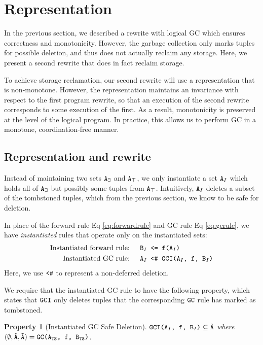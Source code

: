 \documentclass[10pt]{proc}
\numberwithin{equation}{section}
\newtheorem{property}{Property}[section]
\renewcommand{\tt}[1]{\ifmmode\text{\texttt{#1}}\else\texttt{#1}\fi}
\begin{document}
\section{Representation}
In the previous section, we described a rewrite with logical GC which ensures correctness and monotonicity.
However, the garbage collection only marks tuples for possible deletion, and thus does not actually reclaim any storage.
Here, we present a second rewrite that does in fact reclaim storage.

To achieve storage reclamation, our second rewrite will use a representation that is non-monotone.
However, the representation maintains an invariance with respect to the first program rewrite, so that an execution of the second rewrite corresponds to some execution of the first.
As a result, monotonicity is preserved at the level of the logical program.
In practice, this allows us to perform GC in a monotone, coordination-free manner.

\subsection{Representation and rewrite}
Instead of maintaining two sets $\tt{A}_\exists$ and $\tt{A}_\top$, we only instantiate a set $\tt{A}_I$ which holds all of $\tt{A}_\exists$ but possibly some tuples from $\tt{A}_\top$.
Intuitively, $\tt{A}_I$ deletes a subset of the tombstoned tuples, which from the previous section, we know to be safe for deletion.

In place of the forward rule Eq \eqref{eq:forwardrule} and GC rule Eq \eqref{eq:gcrule}, we have \textit{instantiated} rules that operate only on the instantiated sets: 
\begin{align}
\text{Instantiated forward rule: } && \tt{B}_I &\tt{ <= f(A$_I$)}\label{eq:instantiatedforwardrule}\\
\text{Instantiated GC rule: } && \tt{A}_I &\tt{ <\# GCI(A$_I$, f, B$_I$)}\label{eq:instantiatedgcrule}
\end{align}
Here, we use $\tt{<\#}$ to represent a non-deferred deletion.

We require that the instantiated GC rule to have the following property, which states that $\tt{GCI}$ only deletes tuples that the corresponding $\tt{GC}$ rule has marked as tombstoned.
\begin{property}[Instantiated GC Safe Deletion]\label{prp:gcisafe}
$\tt{GCI(A$_I$, f, B$_I$)} \subseteq \tilde{\tt{A}}$ where $(\emptyset, \hat{\tt{A}}, \tilde{\tt{A}}) = \tt{GC(A$_\text{TS}$, f, B$_\text{TS}$)}$.
\end{property}
\end{document}
